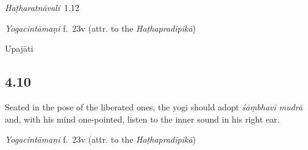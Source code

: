 \begin{ekdosis}
\begin{testimonia}[hp04_009]
\emph{Haṭharatnāvalī}~1.12
\begin{versinnote}
\end{versinnote}

\emph{Yogacintāmaṇi} f.~23v (attr. to the \emph{Haṭhapradīpikā})
\begin{versinnote}
\end{versinnote}

\end{testimonia}


\begin{metre}[hp04_009]
Upajāti
\end{metre}

\subsection*{4.10}
\begin{translation}[hp04_010]
Seated in the pose of the liberated ones, the yogi should adopt \emph{śāṃbhavī mudrā} and, with his mind one-pointed, listen to the inner sound in his right ear.
\end{translation}


\begin{testimonia}[hp04_010]
\emph{Yogacintāmaṇi} f.~23v (attr. to the \emph{Haṭhapradīpikā})
\begin{versinnote}
\end{versinnote}


\end{testimonia}
\end{ekdosis}
